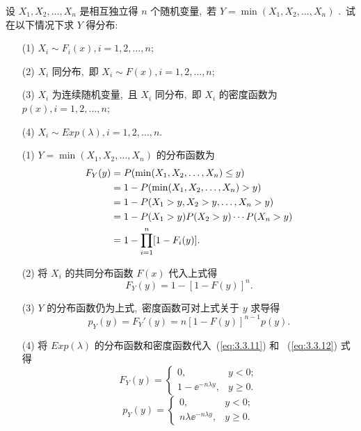    \begin{example}[最小值分布]\label{exam:3.3.5}
   	设 $X_1,X_2,\ldots,X_n$ 是相互独立得 $n$ 个随机变量,\ 若 $Y=\min(X_1,X_2,\ldots,X_n)$ .\ 试在以下情况下求 $Y$ 得分布:
   	\begin{itemize}
   		\item[(1)] $X_i\sim F_i(x),i=1,2,\ldots,n$;
   		\item[(2)] $X_i$ 同分布,\ 即 $X_i\sim F(x),i=1,2,\ldots,n$;
   		\item[(3)] $X_i$ 为连续随机变量,\ 且 $X_i$ 同分布,\ 即 $X_i$ 的密度函数为 $p(x),i=1,2,\ldots,n$;
   		\item[(4)] $X_i\sim Exp(\lambda),i=1,2,\ldots,n$.
   	\end{itemize}
   	\begin{solution}
   		\begin{itemize}
   			\item[(1)] $Y=\min(X_1,X_2,\ldots,X_n)$ 的分布函数为
   			\begin{align}
   				F_Y(y)&=P(\min(X_1,X_2,\ldots,X_n)\leqslant y)\notag\\
   				&=1-P(\min(X_1,X_2,\ldots,X_n)>y)\notag\\
   				&=1-P(X_1>y,X_2>y,\ldots,X_n>y)\notag\\
   				&=1-P(X_1>y)P(X_2>y)\cdots P(X_n>y)\notag\\
   				&=1-\prod_{i=1}^{n}[1-F_i(y)].\label{eq:3.3.10}
   			\end{align}
   			\item[(2)] 将 $X_i$ 的共同分布函数 $F(x)$ 代入上式得
   			\begin{equation}
   				F_Y(y)=1-[1-F(y)]^n.\label{eq:3.3.11}
   			\end{equation}
   			\item[(3)] $Y$ 的分布函数仍为上式,\ 密度函数可对上式关于 $y$ 求导得
   			\begin{equation}
   				p_Y(y)=F_Y'(y)=n[1-F(y)]^{n-1}p(y).\label{eq:3.3.12}
   			\end{equation}
   			\item[(4)] 将 $Exp(\lambda)$ 的分布函数和密度函数代入~(\ref{eq:3.3.11}) 和 ~(\ref{eq:3.3.12}) 式得
   			\begin{equation*}
   				F_Y(y)=\begin{cases}
   					0, & y<0;\\
   					1-\ee^{-n\lambda y}, & y\geqslant0.
   				\end{cases}
   			\end{equation*}
   			\begin{equation*}
   				p_Y(y)=\begin{cases}
   					0, & y<0;\\
   					n\lambda\ee^{-n\lambda y}, & y\geqslant0.
   				\end{cases}
   			\end{equation*}
   		\end{itemize}
   	\end{solution}
   \end{example}
   
